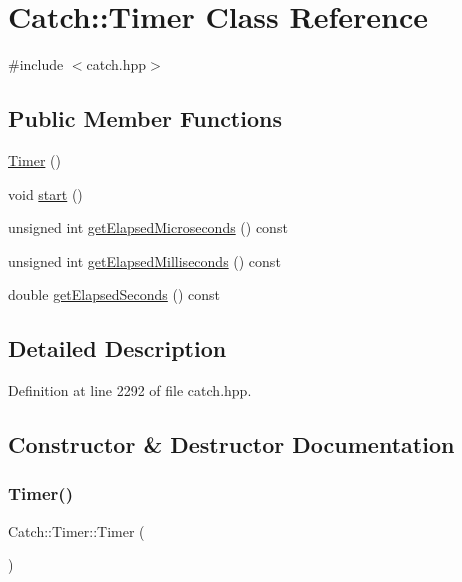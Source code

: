 \hypertarget{class_catch_1_1_timer}{}\section{Catch\+:\+:Timer Class Reference}
\label{class_catch_1_1_timer}


{\ttfamily \#include $<$catch.\+hpp$>$}

\subsection*{Public Member Functions}
\begin{DoxyCompactItemize}
\item 
\hyperlink{class_catch_1_1_timer_af09b7cd7a40af71f4704262afb31558a}{Timer} ()
\item 
void \hyperlink{class_catch_1_1_timer_a0a56e879e43f36c102bf9ea8b5fc8b72}{start} ()
\item 
unsigned int \hyperlink{class_catch_1_1_timer_af592ca4a9d340b9855732e4af777eaf0}{get\+Elapsed\+Microseconds} () const
\item 
unsigned int \hyperlink{class_catch_1_1_timer_a2081b2d36950ab6912e7c4958afe0099}{get\+Elapsed\+Milliseconds} () const
\item 
double \hyperlink{class_catch_1_1_timer_ae1615c8a9aa44b7a96cfe8a35d34e5de}{get\+Elapsed\+Seconds} () const
\end{DoxyCompactItemize}


\subsection{Detailed Description}


Definition at line 2292 of file catch.\+hpp.



\subsection{Constructor \& Destructor Documentation}
\hypertarget{class_catch_1_1_timer_af09b7cd7a40af71f4704262afb31558a}{}\label{class_catch_1_1_timer_af09b7cd7a40af71f4704262afb31558a} 
\subsubsection{\texorpdfstring{Timer()}{Timer()}}
{\footnotesize\ttfamily Catch\+::\+Timer\+::\+Timer (\begin{DoxyParamCaption}{ }\end{DoxyParamCaption})\hspace{0.3cm}{\ttfamily [inline]}}



